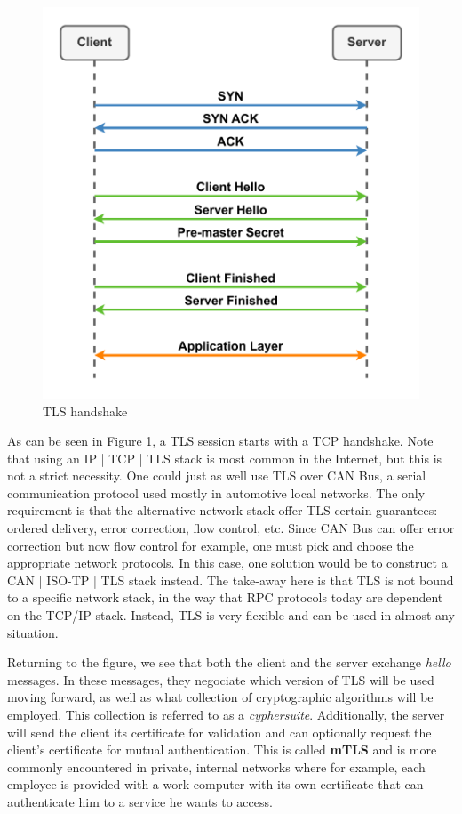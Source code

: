 \begin{figure}[h]
    \centering
    \includegraphics[width=0.9 \textwidth,keepaspectratio]{figures/tls-handshake.pdf}
    \caption{TLS handshake}
    \label{fig:tls-handshake}
\end{figure}

As can be seen in Figure \ref{fig:tls-handshake}, a TLS session starts with a
TCP handshake. Note that using an IP | TCP | TLS stack is most common in the
Internet, but this is not a strict necessity. One could just as well use TLS
over CAN Bus, a serial communication protocol used mostly in automotive local
networks. The only requirement is that the alternative network stack offer TLS
certain guarantees: ordered delivery, error correction, flow control, etc.
Since CAN Bus can offer error correction but now flow control for example, one
must pick and choose the appropriate network protocols. In this case, one
solution would be to construct a CAN | ISO-TP | TLS stack instead. The take-away
here is that TLS is not bound to a specific network stack, in the way that RPC
protocols today are dependent on the TCP/IP stack. Instead, TLS is very flexible
and can be used in almost any situation.

Returning to the figure, we see that both the client and the server exchange
\textit{hello} messages. In these messages, they negociate which version of TLS
will be used moving forward, as well as what collection of cryptographic
algorithms will be employed. This collection is referred to as a
\textit{cyphersuite}. Additionally, the server will send the client its
certificate for validation and can optionally request the client's certificate
for mutual authentication. This is called \textbf{mTLS} and is more commonly
encountered in private, internal networks where for example, each employee is
provided with a work computer with its own certificate that can authenticate
him to a service he wants to access.

